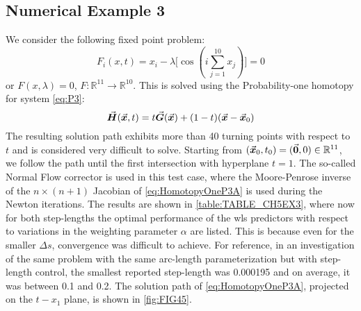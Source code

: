 \subsection{Numerical Example 3}
We consider the following fixed point 
problem\cite{Watson79,Georg81,Schwetlick87}:
\begin{equation}
	F_i(x,t) = x_i-\lambda\bigl[\cos(i\sum_{j=1}^{10} x_j)\bigr]=0
	\label{eq:P3}
\end{equation}
or $F(x,\lambda)=0$, $F:\mathbb{R}^{11}\rightarrow\mathbb{R}^{10}$. This is 
solved using the Probability-one
homotopy\cite{Chow78,Watson:1990} for system \ref{eq:P3}:
\begin{equation}
	\vec{\bm{H}}(\vec{\bm{x}},t)=t \vec{\bm{G}}(\vec{\bm{x}})+(1-t)(\vec{\bm{x}}-\vec{\bm{x}}_0)
	\label{eq:HomotopyOneP3A}
\end{equation}
The resulting solution path exhibits more than 40 turning points with respect to
$t$ and is considered very difficult to solve. Starting from
$(\vec{\bm{x}}_0,t_0)=(\vec{\bm{0}},0)\in\mathbb{R}^{11}$, we follow the path until the
first intersection with hyperplane $t=1$. The so-called Normal Flow
corrector is used in this test case, where the Moore-Penrose inverse of the
$n\times(n+1)$ Jacobian of \ref{eq:HomotopyOneP3A} is used during the Newton 
iterations.
The results are shown in \ref{table:TABLE_CH5EX3}, where now for both 
step-lengths
the optimal performance of the \acrshort{wls} predictors with respect to 
variations in 
the weighting parameter $\alpha$ are listed. This is because even for the 
smaller $\Delta s$, convergence was difficult to achieve. For reference, in an
investigation\cite{Georg81} of the same problem with the same arc-length
parameterization but with step-length control, the smallest reported step-length
was 0.000195 and on average, it was between 0.1 and 0.2. The solution
path of \ref{eq:HomotopyOneP3A}, projected on the $t-x_1$
plane, is shown in \ref{fig:FIG45}.

